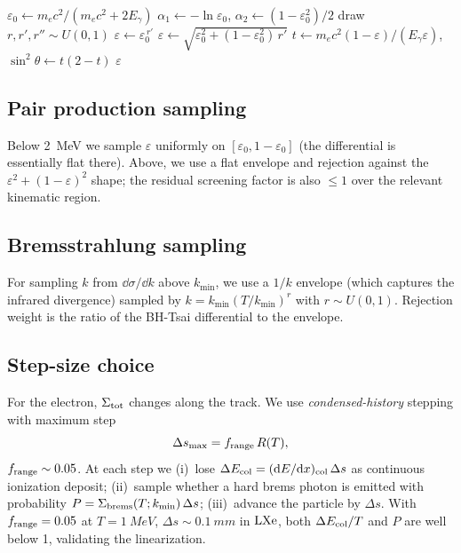 \documentclass[11pt,a4paper]{article}
\newcommand{\Eg}{E_\gamma}
\newcommand{\Egp}{E_\gamma'}
\newcommand{\me}{m_e c^2}
\newcommand{\eps}{\varepsilon}
\newcommand{\kmin}{k_{\min}}
\begin{document}
\begin{algorithm}
\caption{Sampling Klein-Nishina (after \cite{G4-PRM}).}
\label{alg:KN}
\begin{algorithmic}[1]
  \State $\eps_0 \gets \me/(\me+2\Eg)$
  \State $\alpha_1 \gets -\ln \eps_0$,
        $\alpha_2 \gets (1-\eps_0^2)/2$
  \Repeat
    \State draw $r,r',r''\sim U(0,1)$
      \State $\eps \gets \eps_0^{\,r'}$
    \Else
      \State $\eps \gets \sqrt{\eps_0^2 + (1-\eps_0^2)\,r'}$
    \EndIf
    \State $t\gets \me(1-\eps)/(\Eg\eps)$,
           $\sin^2\theta \gets t(2-t)$
  \Until{$g(\eps) = 1 - \eps\sin^2\theta/(1+\eps^2) \ge r''$}
  \State \Return $\eps$  \quad\Comment{$\Egp = \eps\,\Eg$}
\end{algorithmic}
\end{algorithm}

\subsection{Pair production sampling}

Below \SI{2}{MeV} we sample $\eps$ uniformly on $[\eps_0,1-\eps_0]$
(the differential is essentially flat there). Above, we use a
flat envelope and rejection against the $\eps^2+(1-\eps)^2$ shape;
the residual screening factor is also $\le 1$ over the
relevant kinematic region.

\subsection{Bremsstrahlung sampling}

For sampling $k$ from $\dd\sigma/\dd k$ above $\kmin$, we use a
$1/k$ envelope (which captures the infrared divergence) sampled by
\(k = \kmin(T/\kmin)^r\) with $r\sim U(0,1)$. Rejection weight is
the ratio of the BH-Tsai differential to the envelope.

\subsection{Step-size choice}\label{sec:step-size}

For the electron, $\Sigma_{\rm tot}$ changes along the track. We
use \emph{condensed-history} stepping with maximum step
\begin{equation}
  \Delta s_{\max} = f_{\rm range}\,R(T),
\end{equation}
$f_{\rm range}\sim 0.05$. At each step we
(i)~lose $\Delta E_{\rm col}=(\dd E/\dd x)_{\rm col}\,\Delta s$ as
continuous ionization deposit;
(ii)~sample whether a hard brems photon is emitted with probability
$P=\Sigma_{\rm brems}(T;\kmin)\,\Delta s$;
(iii)~advance the particle by $\Delta s$.
With $f_{\rm range}=0.05$ at $T=\SI{1}{MeV}$, $\Delta s\sim
\SI{0.1}{mm}$ in $\rm LXe$, both $\Delta E_{\rm col}/T$ and $P$
are well below 1, validating the linearization.
\end{document}
